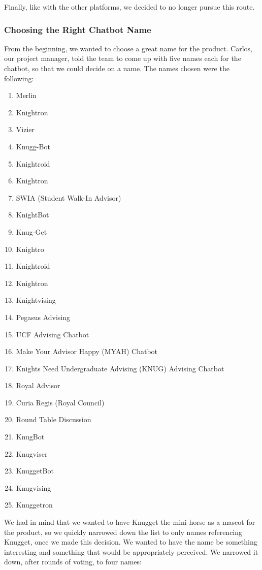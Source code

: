 \documentclass[titlepage, 12pt]{article}
\begin{document}
Finally, like with the other platforms, we decided to no longer pursue this route.

\subsubsection{Choosing the Right Chatbot Name}

From the beginning, we wanted to choose a great name for the product. Carlos, our project manager, told the team to come up with five names each for the chatbot, so that we could decide on a name. The names chosen were the following:

\begin{enumerate}
    \item Merlin
    \item Knightron
    \item Vizier
    \item Knugg-Bot
    \item Knightroid
    \item Knightron
    \item SWIA (Student Walk-In Advisor)
    \item KnightBot
    \item Knug-Get
    \item Knightro
    \item Knightroid
    \item Knightron
    \item Knightvising
    \item Pegasus Advising
    \item UCF Advising Chatbot
    \item Make Your Advisor Happy (MYAH) Chatbot
    \item Knights Need Undergraduate Advising (KNUG) Advising Chatbot
    \item Royal Advisor
    \item Curia Regis (Royal Council)
    \item Round Table Discussion
    \item KnugBot
    \item Knugviser
    \item KnuggetBot
    \item Knugvising
    \item Knuggetron
\end{enumerate}

We had in mind that we wanted to have Knugget the mini-horse as a mascot for the product, so we quickly narrowed down the list to only names referencing Knugget, once we made this decision. We wanted to have the name be something interesting and something that would be appropriately perceived. We narrowed it down, after rounds of voting, to four names: 
\end{document}
